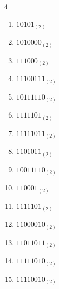 \begin{multicols}{4}
\begin{enumerate}
        \phantom{$=146$}

  \item $10101_{(2)}$

        \phantom{$=21$}

\columnbreak %

  \item $1010000_{(2)}$

        \phantom{$=80$}

  \item $111000_{(2)}$

        \phantom{$=56$}

  \item $11100111_{(2)}$

        \phantom{$=231$}

  \item $10111110_{(2)}$

        \phantom{$=190$}

  \item $1111101_{(2)}$

        \phantom{$=125$}

  \item $11111011_{(2)}$

        \phantom{$=251$}

  \item $1101011_{(2)}$

        \phantom{$=107$}

  \item $10011110_{(2)}$

        \phantom{$=158$}

  \item $110001_{(2)}$

        \phantom{$=49$}

  \item $1111101_{(2)}$

        \phantom{$=125$}

  \item $11000010_{(2)}$

        \phantom{$=194$}

  \item $11011011_{(2)}$

        \phantom{$=219$}

  \item $11111010_{(2)}$

        \phantom{$=250$}

  \item $11110010_{(2)}$


\end{enumerate}
\end{multicols}
